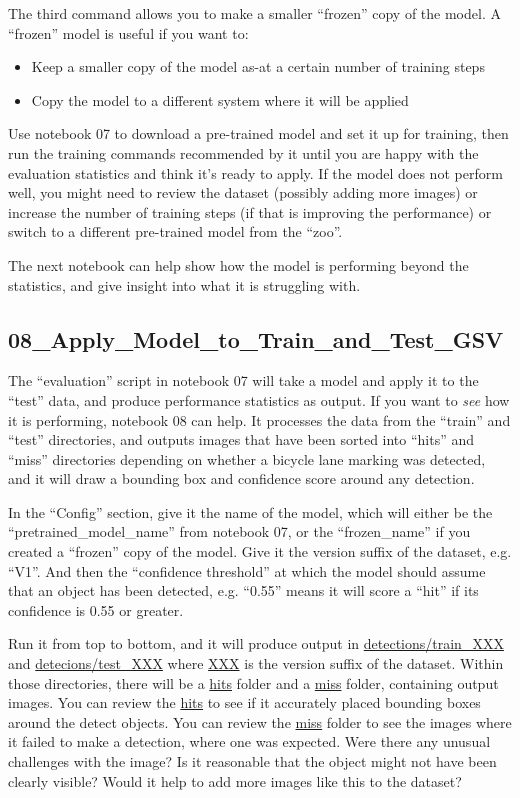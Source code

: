 \documentclass[11pt,twoside]{report}
\begin{document}
The third command allows you to make a smaller ``frozen'' copy of the model.  A ``frozen'' model is useful if you want to:

\begin{itemize}
\item{Keep a smaller copy of the model as-at a certain number of training steps}
\item{Copy the model to a different system where it will be applied}
\end{itemize}

Use notebook 07 to download a pre-trained model and set it up for training, then run the training commands recommended by it until you are happy with the evaluation statistics and think it's ready to apply.  If the model does not perform well, you might need to review the dataset (possibly adding more images) or increase the number of training steps (if that is improving the performance) or switch to a different pre-trained model from the ``zoo''.

The next notebook can help show how the model is performing beyond the statistics, and give insight into what it is struggling with.


\subsection{08\_Apply\_Model\_to\_Train\_and\_Test\_GSV}
\label{a08}

The ``evaluation'' script in notebook 07 will take a model and apply it to the ``test'' data, and produce performance statistics as output.  If you want to \textit{see} how it is performing, notebook 08 can help.  It processes the data from the ``train'' and ``test'' directories, and outputs images that have been sorted into ``hits'' and ``miss'' directories depending on whether a bicycle lane marking was detected, and it will draw a bounding box and confidence score around any detection.

In the ``Config'' section, give it the name of the model, which will either be the ``pretrained\_model\_name'' from notebook 07, or the ``frozen\_name'' if you created a ``frozen'' copy of the model.  Give it the version suffix of the dataset, e.g. ``V1''.  And then the ``confidence threshold'' at which the model should assume that an object has been detected, e.g. ``0.55'' means it will score a ``hit'' if its confidence is 0.55 or greater.

Run it from top to bottom, and it will produce output in \url{detections/train_XXX} and \url{detecions/test_XXX} where \url{XXX} is the version suffix of the dataset.  Within those directories, there will be a \url{hits} folder and a \url{miss} folder, containing output images.  You can review the \url{hits} to see if it accurately placed bounding boxes around the detect objects.  You can review the \url{miss} folder to see the images where it failed to make a detection, where one was expected.  Were there any unusual challenges with the image?  Is it reasonable that the object might not have been clearly visible?  Would it help to add more images like this to the dataset?
\end{document}
